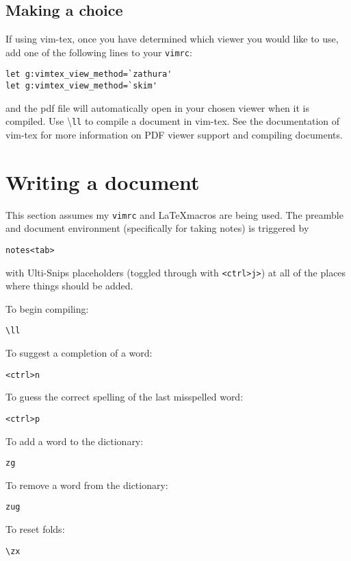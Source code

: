 \documentclass{amsart}
\begin{document}
\subsection{Making a choice}

If using vim-tex, once you have determined which viewer you would like to use, add one of the following
lines to your \texttt{vimrc}:
\begin{verbatim}
let g:vimtex_view_method=`zathura'
let g:vimtex_view_method=`skim'
\end{verbatim}
and the pdf file will automatically open in your chosen viewer when it is compiled.
Use \textbackslash\texttt{ll} to compile a document in vim-tex.
See the documentation of vim-tex for more information on PDF viewer support and compiling
documents.

\section{Writing a document}

This section assumes my \texttt{vimrc} and \LaTeX macros are being used.
The preamble and document environment (specifically for taking notes) is triggered by
\begin{verbatim}
notes<tab>
\end{verbatim}
with Ulti-Snips placeholders (toggled through with \texttt{<ctrl>j>}) 
at all of the places where things should be added. 

To begin compiling:
\begin{verbatim}
\ll
\end{verbatim}

To suggest a completion of a word:
\begin{verbatim}
<ctrl>n
\end{verbatim}

To guess the correct spelling of the last misspelled word:
\begin{verbatim}
<ctrl>p
\end{verbatim}

To add a word to the dictionary:
\begin{verbatim}
zg
\end{verbatim}

To remove a word from the dictionary:
\begin{verbatim}
zug
\end{verbatim}

To reset folds:
\begin{verbatim}
\zx 
\end{verbatim}
\end{document}
